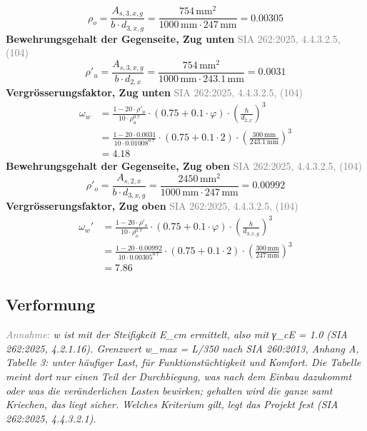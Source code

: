 \documentclass[11pt,a4paper]{article}
\newcommand{\normref}[1]{{\small\textcolor{gray}{#1}}}
\newcommand{\hinweis}[2]{\par\noindent\textcolor{gray}{\textit{#1:}} \textit{#2}\par}
\begin{document}
\begin{equation*}
\rho_{o} = \frac{A_{s,3,x,g}}{b \cdot d_{3,x,g}} = \frac{754\,\mathrm{mm}^{2}}{1000\,\mathrm{mm} \cdot 247\,\mathrm{mm}} = 0.00305
\end{equation*}
\noindent\textbf{Bewehrungsgehalt der Gegenseite, Zug unten} \hfill \normref{SIA 262:2025, 4.4.3.2.5, (104)}
\begin{equation*}
\rho'_{u} = \frac{A_{s,3,x,g}}{b \cdot d_{2,x}} = \frac{754\,\mathrm{mm}^{2}}{1000\,\mathrm{mm} \cdot 243.1\,\mathrm{mm}} = 0.0031
\end{equation*}
\noindent\textbf{Vergrösserungsfaktor, Zug unten} \hfill \normref{SIA 262:2025, 4.4.3.2.5, (104)}
\begin{equation*}
\begin{aligned}
  \omega_w &= \frac{1 - 20 \cdot \rho'_{u}}{10 \cdot \rho_{u}^{0.7}} \cdot \left(0.75 + 0.1 \cdot \varphi\right) \cdot \left(\frac{h}{d_{2,x}}\right)^{3} \\
  &= \frac{1 - 20 \cdot 0.0031}{10 \cdot 0.01008^{0.7}} \cdot \left(0.75 + 0.1 \cdot 2\right) \cdot \left(\frac{300\,\mathrm{mm}}{243.1\,\mathrm{mm}}\right)^{3} \\
  &= 4.18
\end{aligned}
\end{equation*}
\noindent\textbf{Bewehrungsgehalt der Gegenseite, Zug oben} \hfill \normref{SIA 262:2025, 4.4.3.2.5, (104)}
\begin{equation*}
\rho'_{o} = \frac{A_{s,2,x}}{b \cdot d_{3,x,g}} = \frac{2450\,\mathrm{mm}^{2}}{1000\,\mathrm{mm} \cdot 247\,\mathrm{mm}} = 0.00992
\end{equation*}
\noindent\textbf{Vergrösserungsfaktor, Zug oben} \hfill \normref{SIA 262:2025, 4.4.3.2.5, (104)}
\begin{equation*}
\begin{aligned}
  \omega_w' &= \frac{1 - 20 \cdot \rho'_{o}}{10 \cdot \rho_{o}^{0.7}} \cdot \left(0.75 + 0.1 \cdot \varphi\right) \cdot \left(\frac{h}{d_{3,x,g}}\right)^{3} \\
  &= \frac{1 - 20 \cdot 0.00992}{10 \cdot 0.00305^{0.7}} \cdot \left(0.75 + 0.1 \cdot 2\right) \cdot \left(\frac{300\,\mathrm{mm}}{247\,\mathrm{mm}}\right)^{3} \\
  &= 7.86
\end{aligned}
\end{equation*}
\subsection{Verformung}
\hinweis{Annahme}{w ist mit der Steifigkeit E\_cm ermittelt, also mit γ\_cE = 1.0 (SIA 262:2025, 4.2.1.16). Grenzwert w\_max = L/350 nach SIA 260:2013, Anhang A, Tabelle 3: unter häufiger Last, für Funktionstüchtigkeit und Komfort. Die Tabelle meint dort nur einen Teil der Durchbiegung, was nach dem Einbau dazukommt oder was die veränderlichen Lasten bewirken; gehalten wird die ganze samt Kriechen, das liegt sicher. Welches Kriterium gilt, legt das Projekt fest (SIA 262:2025, 4.4.3.2.1).}
\end{document}
